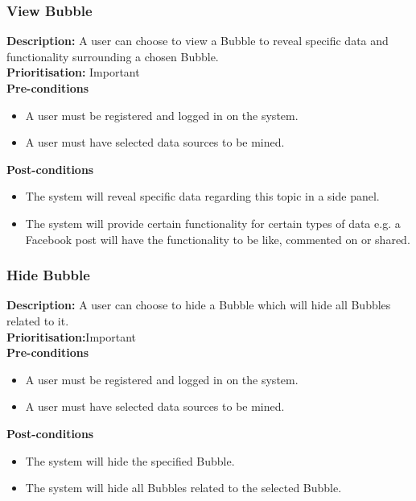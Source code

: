 \documentclass[hidelinks,english]{article}
\begin{document}
			\subsubsection{View Bubble}
				\textbf{Description:}  A user can choose to view a Bubble to reveal specific data and functionality surrounding a chosen Bubble.
				\\
			    \textbf{Prioritisation:} Important\\
			    \textbf{Pre-conditions}
			    \begin{itemize}
			        \item A user must be registered and logged in on the system.
			        \item A user must have selected data sources to be mined.
			    \end{itemize}
				\textbf{Post-conditions}
				\begin{itemize}
					\item The system will reveal specific data regarding this topic in a side panel.
					\item The system will provide certain functionality for certain types of data e.g. a Facebook post will have the functionality to be like, commented on or shared.
				\end{itemize}
   			\subsubsection{Hide Bubble}
				\textbf{Description:}  A user can choose to hide a Bubble which will hide all Bubbles related to it.
				\\
			    \textbf{Prioritisation:}Important\\
     			\textbf{Pre-conditions}
				\begin{itemize}
					\item A user must be registered and logged in on the system.
					\item A user must have selected data sources to be mined.
				\end{itemize}
    			\textbf{Post-conditions}
     			\begin{itemize}
			        \item The system will hide the specified Bubble.
			        \item The system will hide all Bubbles related to the selected Bubble.
    			\end{itemize}
\end{document}

